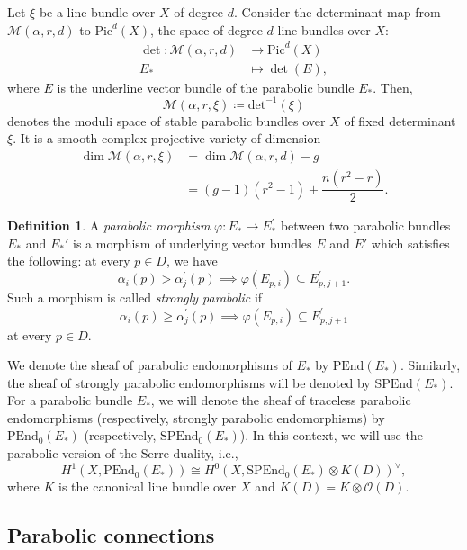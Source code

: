 \documentclass[11pt, reqno]{amsart}
\numberwithin{equation}{section}
\theoremstyle{definition}
\newtheorem{definition}{Definition}[section]
\begin{document}
 	Let $\xi$ be a line bundle over $X$ of degree $d$. Consider the determinant map from $\mathcal{M}(\alpha, r, d)$ to $\mathrm{Pic}^d(X)$, the space of degree $d$ line bundles over $X$:
  \begin{align*}
      \det : \mathcal{M}(\alpha, r, d) &\longrightarrow \mathrm{Pic}^d(X) \\
      E_* &\mapsto \det(E),
  \end{align*}
   where $E$ is the underline vector bundle of the parabolic bundle $E_*$.
  Then, 
  \[
  \mathcal{M}(\alpha, r, \xi) \coloneqq \mathrm{det}^{-1}(\xi)
  \]
  denotes the moduli space of stable parabolic bundles over $X$ of fixed determinant $\xi$. It is a smooth complex projective variety of dimension
	\begin{align*}
	    \dim \mathcal{M}(\alpha, r, \xi) &= \dim \mathcal{M}(\alpha, r, d) - g\\
     &= (g-1)(r^2-1) + \dfrac{n(r^2-r)}{2}.
	\end{align*}

 \begin{definition}
		A \textit{parabolic morphism} $\varphi : E_* \to E^\prime_*$ between two parabolic bundles $E_*$ and $E_*'$ is a morphism of underlying vector bundles $E$ and $E'$ which satisfies
		the following: at every $p \in D$, we have 
		\[
		\alpha_i(p) > \alpha_j^\prime(p) \implies \varphi(E_{p,i}) \subseteq E_{p,j+1}^\prime.
		\]
		Such a morphism is called \textit{strongly parabolic} if
		\[ \alpha_i(p) \geq \alpha_j^\prime(p) \implies \varphi(E_{p,i}) \subseteq E_{p,j+1}^\prime
		\]
		at every $p \in D$.
	\end{definition}
 We denote the sheaf of parabolic endomorphisms of $E_*$ by $\mathrm{PEnd}(E_*)$. Similarly, the sheaf of strongly parabolic endomorphisms will be denoted by $\mathrm{SPEnd}(E_*)$. For a parabolic bundle $E_*$, we will denote the sheaf of traceless parabolic endomorphisms (respectively, strongly parabolic endomorphisms) by $\mathrm{PEnd}_0(E_*)$ (respectively, $\mathrm{SPEnd}_0(E_*)$). In this context, we will use the parabolic version of the Serre duality, i.e.,
  \[
  H^1(X, \mathrm{PEnd}_0(E_*)) \cong H^0(X, \mathrm{SPEnd}_0(E_*) \otimes K(D))^\vee,
  \]
where $K$ is the canonical line bundle over $X$ and $K(D) = K \otimes \mathcal{O}(D)$.
	
	\subsection{Parabolic connections}
 
\end{document}
